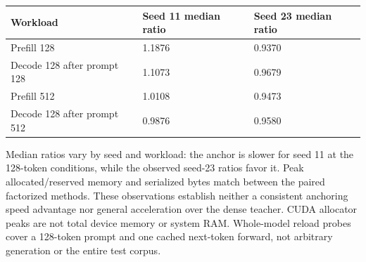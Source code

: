 \documentclass[10pt,a4paper,twocolumn]{article}
\begin{document}
{\scriptsize\setlength{\tabcolsep}{2pt}
\noindent\begin{tabular}{@{}p{}p{}p{}@{}}\toprule
Workload & Seed 11 median ratio & Seed 23 median ratio \\
\midrule
Prefill 128 & 1.1876 & 0.9370 \\
Decode 128 after prompt 128 & 1.1073 & 0.9679 \\
Prefill 512 & 1.0108 & 0.9473 \\
Decode 128 after prompt 512 & 0.9876 & 0.9580 \\
\bottomrule\end{tabular}}\par\medskip
Median ratios vary by seed and workload: the anchor is slower for seed 11 at the 128-token conditions, while the observed seed-23 ratios favor it. Peak allocated/reserved memory and serialized bytes match between the paired factorized methods. These observations establish neither a consistent anchoring speed advantage nor general acceleration over the dense teacher. CUDA allocator peaks are not total device memory or system RAM. Whole-model reload probes cover a 128-token prompt and one cached next-token forward, not arbitrary generation or the entire test corpus.\par\smallskip
\end{document}
